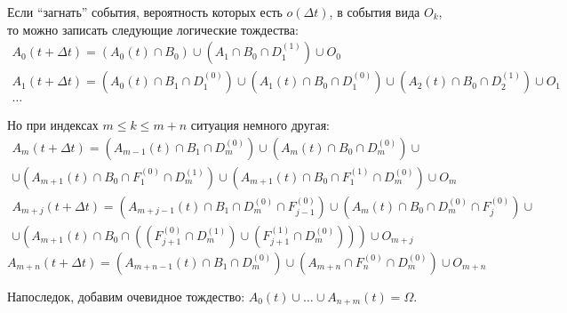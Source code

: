 Если ``загнать'' события, вероятность которых есть \(o(\Delta t)\), в события 
вида \(O_{k}\), то можно записать следующие логические тождества:
\begin{gather}
	A_{0}(t + \Delta t) = (A_{0}(t) \cap B_{0}) \cup (A_{1} \cap B_{0} \cap 
	D_{1}^{(1)}) \cup O_{0} \\
	A_{1}(t + \Delta t) = (A_{0}(t) \cap B_{1} \cap D_{1}^{(0)}) \cup (A_{1}(t) 
	\cap B_{0} \cap D_{1}^{(0)}) \cup (A_{2}(t) \cap B_{0} \cap D_{2}^{(1)}) 
	\cup O_{1} \\
	\ldots
\end{gather}

Но при индексах \(m \leq k \leq m + n\) ситуация немного другая:
\begin{multline*}
	A_{m}(t + \Delta t) = (A_{m - 1}(t) \cap B_{1} \cap D_{m}^{(0)}) \cup 
	(A_{m}(t) \cap B_{0} \cap D_{m}^{(0)}) \cup \\ \cup (A_{m + 1}(t) \cap 
	B_{0} \cap F_{1}^{(0)} \cap D_{m}^{(1)}) \cup (A_{m + 1}(t) \cap 
	B_{0} \cap F_{1}^{(1)} \cap D_{m}^{(0)}) \cup O_{m}
\end{multline*}
\begin{multline*}
	A_{m + j}(t + \Delta t) = (A_{m + j - 1}(t) \cap B_{1} \cap D_{m}^{(0)} 
	\cap F_{j - 1}^{(0)}) \cup 
	(A_{m}(t) \cap B_{0} \cap D_{m}^{(0)} \cap F_{j}^{(0)}) \cup \\ \cup (A_{m 
	+ 1}(t) \cap B_{0} \cap ((F_{j + 1}^{(0)} \cap D_{m}^{(1)}) \cup (F_{j + 
	1}^{(1)} \cap D_{m}^{(0)}))) \cup O_{m + j}
\end{multline*}
\[
	A_{m + n}(t + \Delta t) = (A_{m + n - 1}(t) \cap B_{1} \cap D_{m}^{(0)}) 
	\cup (A_{m + n} \cap F_{n}^{(0)} \cap D_{m}^{(0)}) \cup O_{m + n} 
\]

Напоследок, добавим очевидное тождество: \(A_{0}(t) \cup \ldots \cup A_{n + 
m}(t) = \Omega\).


